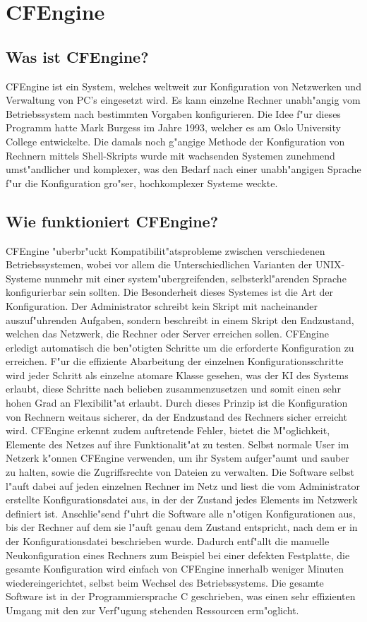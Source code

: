 
\section{CFEngine}
\subsection{Was ist CFEngine?}
CFEngine ist ein System, welches weltweit zur Konfiguration von Netzwerken und Verwaltung von PC's eingesetzt wird. Es kann einzelne Rechner unabh"angig vom Betriebssystem nach bestimmten Vorgaben konfigurieren. Die Idee f"ur dieses Programm hatte Mark Burgess im Jahre 1993, welcher es am Oslo University College entwickelte. Die damals noch g"angige Methode der Konfiguration von Rechnern mittels Shell-Skripts wurde mit wachsenden Systemen zunehmend umst"andlicher und komplexer, was den Bedarf nach einer unabh"angigen Sprache f"ur die Konfiguration gro"ser, hochkomplexer Systeme weckte.
\subsection{Wie funktioniert CFEngine?}
CFEngine "uberbr"uckt Kompatibilit"atsprobleme zwischen verschiedenen Betriebssystemen, wobei vor allem die Unterschiedlichen Varianten der UNIX-Systeme nunmehr mit einer system"ubergreifenden, selbsterkl"arenden Sprache konfigurierbar sein sollten. Die Besonderheit dieses Systemes ist die Art der Konfiguration. Der Administrator schreibt kein Skript mit nacheinander auszuf"uhrenden Aufgaben, sondern beschreibt in einem Skript den Endzustand, welchen das Netzwerk, die Rechner oder Server erreichen sollen. CFEngine erledigt automatisch die ben"otigten Schritte um die erforderte Konfiguration zu erreichen. F"ur die effiziente Abarbeitung der einzelnen Konfigurationsschritte wird jeder Schritt als einzelne atomare Klasse gesehen, was der KI des Systems erlaubt, diese Schritte nach belieben zusammenzusetzen und somit einen sehr hohen Grad an Flexibilit"at erlaubt.
Durch dieses Prinzip ist die Konfiguration von Rechnern weitaus sicherer, da der Endzustand des Rechners sicher erreicht wird. CFEngine erkennt zudem auftretende Fehler, bietet die M"oglichkeit, Elemente des Netzes auf ihre Funktionalit"at zu testen. Selbst normale User im Netzerk k"onnen CFEngine verwenden, um ihr System aufger"aumt und sauber zu halten, sowie die Zugriffsrechte von Dateien zu verwalten.
Die Software selbst l"auft dabei auf jeden einzelnen Rechner im Netz und liest die vom Administrator erstellte Konfigurationsdatei aus, in der der Zustand jedes Elements im Netzwerk definiert ist. Anschlie"send f"uhrt die Software alle n"otigen Konfigurationen aus, bis der Rechner auf dem sie l"auft genau dem Zustand entspricht, nach dem er in der Konfigurationsdatei beschrieben wurde. Dadurch entf"allt die manuelle Neukonfiguration eines Rechners zum Beispiel bei einer defekten Festplatte, die gesamte Konfiguration wird einfach von CFEngine innerhalb weniger Minuten wiedereingerichtet, selbst beim Wechsel des Betriebssystems.
Die gesamte Software ist in der Programmiersprache C geschrieben, was einen sehr effizienten Umgang mit den zur Verf"ugung stehenden Ressourcen erm"oglicht.
